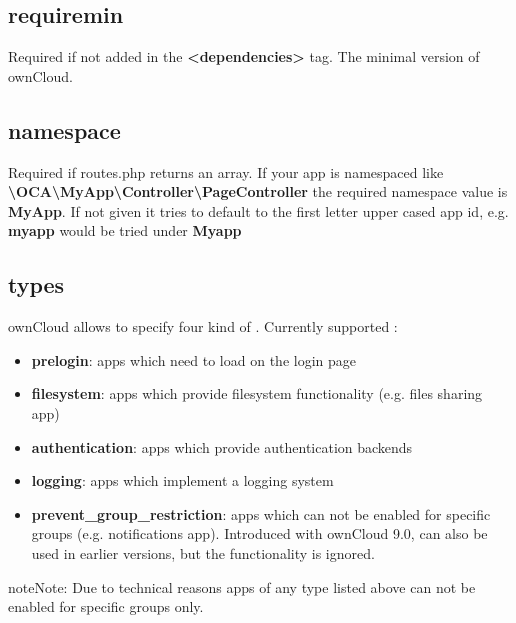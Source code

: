 \documentclass[letterpaper,10pt,english]{sphinxmanual}
\begin{document}
\subsection{requiremin}
\label{app/info:requiremin}
Required if not added in the \textbf{\textless{}dependencies\textgreater{}} tag. The minimal version of ownCloud.


\subsection{namespace}
\label{app/info:namespace}
Required if routes.php returns an array. If your app is namespaced like \textbf{\textbackslash{}OCA\textbackslash{}MyApp\textbackslash{}Controller\textbackslash{}PageController} the required namespace value is \textbf{MyApp}. If not given it tries to default to the first letter upper cased app id, e.g. \textbf{myapp} would be tried under \textbf{Myapp}


\subsection{types}
\label{app/info:types}
ownCloud allows to specify four kind of . Currently supported :
\begin{itemize}
\item {} 
\textbf{prelogin}: apps which need to load on the login page

\item {} 
\textbf{filesystem}: apps which provide filesystem functionality (e.g. files sharing app)

\item {} 
\textbf{authentication}: apps which provide authentication backends

\item {} 
\textbf{logging}: apps which implement a logging system

\item {} 
\textbf{prevent\_group\_restriction}: apps which can not be enabled for specific groups (e.g. notifications app).
Introduced with ownCloud 9.0, can also be used in earlier versions, but the functionality is ignored.

\end{itemize}

\begin{notice}{note}{Note:}
Due to technical reasons apps of any type listed above can not be enabled for specific groups only.
\end{notice}
\end{document}
